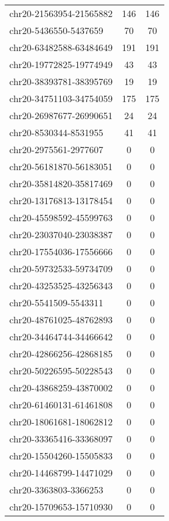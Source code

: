 \begin{longtable}{lSS}
	chr20-21563954-21565882 & 146  & 146                             \\
	chr20-5436550-5437659   & 70   & 70                              \\
	chr20-63482588-63484649 & 191  & 191                             \\
	chr20-19772825-19774949 & 43   & 43                              \\
	chr20-38393781-38395769 & 19   & 19                              \\
	chr20-34751103-34754059 & 175  & 175                             \\
	chr20-26987677-26990651 & 24   & 24                              \\
	chr20-8530344-8531955   & 41   & 41                              \\
	chr20-2975561-2977607   & 0    & 0                               \\
	chr20-56181870-56183051 & 0    & 0                               \\
	chr20-35814820-35817469 & 0    & 0                               \\
	chr20-13176813-13178454 & 0    & 0                               \\
	chr20-45598592-45599763 & 0    & 0                               \\
	chr20-23037040-23038387 & 0    & 0                               \\
	chr20-17554036-17556666 & 0    & 0                               \\
	chr20-59732533-59734709 & 0    & 0                               \\
	chr20-43253525-43256343 & 0    & 0                               \\
	chr20-5541509-5543311   & 0    & 0                               \\
	chr20-48761025-48762893 & 0    & 0                               \\
	chr20-34464744-34466642 & 0    & 0                               \\
	chr20-42866256-42868185 & 0    & 0                               \\
	chr20-50226595-50228543 & 0    & 0                               \\
	chr20-43868259-43870002 & 0    & 0                               \\
	chr20-61460131-61461808 & 0    & 0                               \\
	chr20-18061681-18062812 & 0    & 0                               \\
	chr20-33365416-33368097 & 0    & 0                               \\
	chr20-15504260-15505833 & 0    & 0                               \\
	chr20-14468799-14471029 & 0    & 0                               \\
	chr20-3363803-3366253   & 0    & 0                               \\
	chr20-15709653-15710930 & 0    & 0                               \\
\end{longtable}
